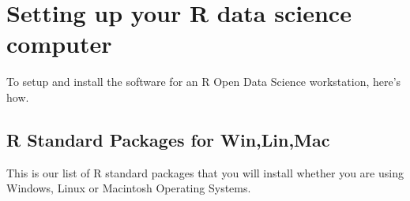 \documentclass[10pt]{article} %
\begin{document}




  \pagebreak


\section{Setting up your R data science computer}

To setup and install the software for an R Open Data Science workstation, here's how. \\

 \subsection{R Standard Packages for Win,Lin,Mac}\label{subsec:rstandpack}

    This is our list of R standard packages that you will install whether you are using Windows, Linux or Macintosh Operating Systems.
\end{document}
